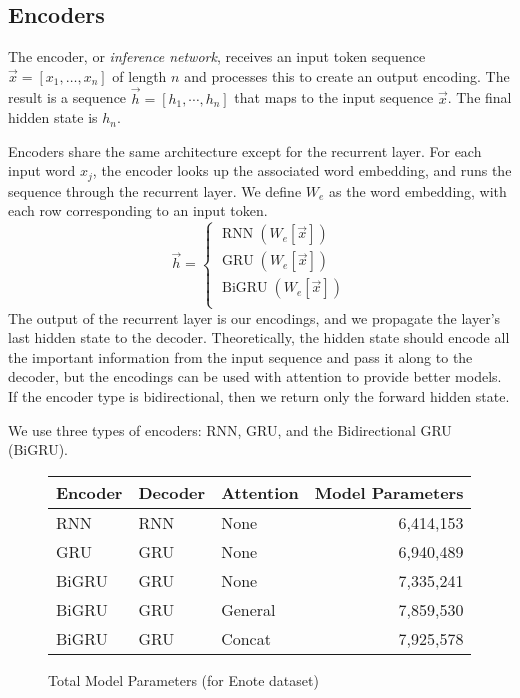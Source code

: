 \documentclass[twoside,twocolumn]{article}
\begin{document}
\subsection{Encoders}
The encoder, or \emph{inference network}, receives an input token sequence
$\vec{x} = \left[{x_1,\hdots, x_n}\right]$ of length $n$ and processes
this to create an output encoding. The result is a sequence
$\vec{h} = \left[{h_1, \cdots, h_{n}}\right]$ that
maps to the input sequence $\vec{x}$. The final hidden state is $h_n$.

Encoders share the same architecture except for the recurrent layer.
For each input word $x_j$, the encoder looks up the associated word embedding,
and runs the sequence through the recurrent layer. We define $W_e$ as the word
embedding, with each row corresponding to an input token.
\begin{equation}
  \vec{h} = \begin{cases}
    \operatorname{RNN} (W_e[\vec{x}]) \\
    \operatorname{GRU} (W_e[\vec{x}]) \\
    \operatorname{BiGRU} (W_e[\vec{x}]) \\
  \end{cases}
\end{equation}
The output of the recurrent layer is our encodings, and we propagate
the layer's last hidden state to the decoder. Theoretically, the hidden
state should encode all the important information from the input sequence
and pass it along to the decoder, but the
encodings can be used with attention to provide better models. If the encoder
type is bidirectional, then we return only the forward hidden state.

We use three types of encoders: RNN, GRU, and the Bidirectional GRU (BiGRU).
\begin{figure*}
    \centering
    \begin{tabular}{ |l|l|l|r| }
        \hline
        \textbf{Encoder}
          & \textbf{Decoder}
          & \textbf{Attention}
          & \textbf{Model Parameters}\\
        \hline
        RNN & RNN & None & 6,414,153 \\ \hline
        GRU & GRU & None & 6,940,489 \\ \hline
        BiGRU & GRU & None & 7,335,241 \\ \hline
        BiGRU & GRU & General & 7,859,530 \\ \hline
        BiGRU & GRU & Concat & 7,925,578 \\ \hline
    \end{tabular}

    \caption{Total Model Parameters (for Enote dataset)}
    \label{fig:data-lines-enotes}
\end{figure*}
\end{document}
